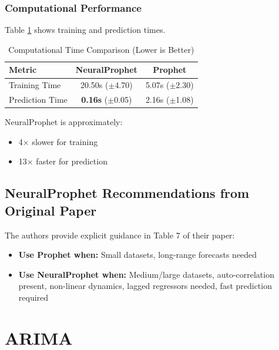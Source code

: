 \documentclass[12pt,a4paper]{article}
\begin{document}
\subsubsection{Computational Performance}

Table \ref{tab:np_compute} shows training and prediction times.

\begin{table}[htbp]
\centering
\caption{Computational Time Comparison (Lower is Better)}
\label{tab:np_compute}
\begin{tabular}{|l|c|c|}
\hline
\textbf{Metric} & \textbf{NeuralProphet} & \textbf{Prophet} \\
\hline
Training Time & 20.50s ($\pm$4.70) & 5.07s ($\pm$2.30) \\
Prediction Time & \textbf{0.16s} ($\pm$0.05) & 2.16s ($\pm$1.08) \\
\hline
\end{tabular}
\end{table}

NeuralProphet is approximately:
\begin{itemize}
    \item 4$\times$ slower for training
    \item 13$\times$ faster for prediction
\end{itemize}

\subsection{NeuralProphet Recommendations from Original Paper}

The authors provide explicit guidance in Table 7 of their paper:

\begin{itemize}
    \item \textbf{Use Prophet when:} Small datasets, long-range forecasts needed
    \item \textbf{Use NeuralProphet when:} Medium/large datasets, auto-correlation present, non-linear dynamics, lagged regressors needed, fast prediction required
\end{itemize}


\section{ARIMA}
\end{document}
